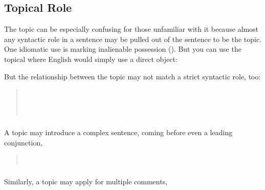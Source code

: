 \subsection{Topical Role} \label{pragma:topical-role}
The topic can be especially confusing for those unfamiliar with it
because almost any syntactic role in a sentence may be pulled out of
the sentence to be the topic.  One idiomatic use is marking
inalienable possession (). But you can use
the topical where English would simply use a direct object:

\begin{quotation}
\noindent{}

\medskip
\noindent{} 
\end{quotation}

\noindent But the relationship between the topic may not match a
strict syntactic role, too:

\begin{quotation}
\noindent{}\\
\indent{}

\medskip
\noindent{}\\
\indent{}
\end{quotation}

\subsubsection{} A topic may introduce a complex sentence, coming
before even a leading conjunction,

\begin{quotation}
\noindent{}\\
\indent{}
\end{quotation}

\subsubsection{} Similarly, a topic may apply for multiple comments, 

